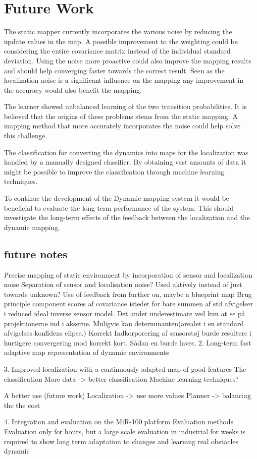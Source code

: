 \section{Future Work}

The static mapper currently incorporates the various noise by reducing the update values in the map. 
A possible improvement to the weighting could be considering the entire covariance matrix instead of the individual standard deviation. 
Using the noise more proactive could also improve the mapping results and should help converging faster towards the correct result.
Seen as the localization noise is a significant influence on the mapping any improvement in the accuracy would also benefit the mapping.


The learner showed unbalanced learning of the two transition probabilities.
It is believed that the origins of these problems stems from the static mapping. 
A mapping method that more accurately incorporates the noise could help solve this challenge. 


The classification for converting the dynamics into maps for the localization was handled by a manually designed classifier.
By obtaining vast amounts of data it might be possible to improve the classification through machine learning techniques. 


To continue the development of the Dynamic mapping system it would be beneficial to evaluate the long term performance of the system. 
This should investigate the long-term effects of the feedback between the localization and the dynamic mapping.



\subsection{future notes}

Precise mapping of static environment by incorporation of sensor and localization noise
Separation of sensor and localisation noise?
Used aktively instead of just towards unknown?
Use of feedback from further on, maybe a blueprint map
Brug principle component scores af covariance istedet for bare summen af std afvigelser i reduced ideal inverse sensor model. Det andet underestimate ved kun at se på projektionerne ind i akserne. Muligvis kan determinanten(arealet i en standard afvigelses konfidens elipse.)
Korrekt Indkorporering af sensorstøj burde resultere i hurtigere convergering mod korrekt kort. Sådan en burde laves.
2. Long-term fast adaptive map representation of dynamic environments

3. Improved localization with a continuously adapted map of good features
The classification
More data -> better classification
Machine learning techniques?

A better use (future work)
Localization -> use more values
Planner -> balancing the the cost


4. Integration and evaluation on the MiR-100 platform
Evaluation methods
Evaluation only for hours, but a large scale evaluation in industrial for weeks is required to show long term adaptation to changes and learning real obstacles dynamic


